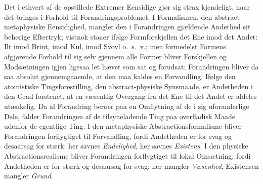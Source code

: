 \documentclass[12pt,a4paper]{book}
\begin{document}
Det i ethvert af de opstillede Extremer Eensidige gjør
sig strax kjendeligt, naar det bringes i Forhold til
Forandringsproblemet. I Formalismen, den abstract metaphysiske
Eensidighed, mangler den i Forandringen gjældende Andethed
sit behørige Eftertryk; vistnok staaer ifølge Formforskjellen
det Ene imod det Andet: Ilt imod Brint, imod Kul, imod
Svovl o.~s.~v.; men formedelst Formens afgjørende Forhold
til sig selv gjennem alle Former bliver Forskjellen og
Modsætningen igjen ligesaa let hævet som sat og forudsat;
Forandringen bliver da saa absolut gjennemgaaende, at den maa
kaldes en Forvandling. Ifølge den atomistiske Tingsforestilling,
den abstract-physiske Synsmaade, er Andetheden i den Grad
forstenet, at en væsentlig Overgang fra det Ene til det Andet
er aldeles utænkelig. Da al Forandring beroer paa en
Omflytning af de i sig uforanderlige Dele, falder
Forandringen af de tilsyneladende Ting paa overfladisk Maade
udenfor de egentlige Ting. I den metaphysiske
Abstractionsformalisme bliver Forandringen forflygtiget til Forvandling,
fordi Andetheden er for svag og desaarsag for stærk: her savnes
\emph{Endelighed}, her savnes \emph{Existens}. I den physiske
Abstractionsrealisme bliver Forandringen forflygtiget til lokal
Omsætning, fordi Andetheden er for stærk og desaarsag for
svag: her mangler \emph{Væsenhed}, Existensen mangler
\emph{Grund}.
\end{document}
